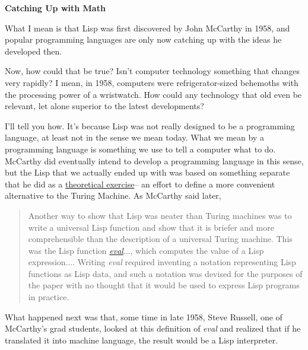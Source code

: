 \textbf{Catching Up with Math}

What I mean is that Lisp was first discovered by
                  John McCarthy in 1958, and popular programming languages are
                  only now catching up with the ideas he developed then.

Now,
                  how could that be true? Isn't computer technology something
                  that changes very rapidly? I mean, in 1958, computers were
                  refrigerator-sized behemoths with the processing power of a
                  wristwatch. How could any technology that old even be
                  relevant, let alone superior to the latest developments?

I'll
                  tell you how. It's because Lisp was not really designed to be
                  a programming language, at least not in the sense we mean
                  today. What we mean by a programming language is something we
                  use to tell a computer what to do. McCarthy did eventually
                  intend to develop a programming language in this sense, but
                  the Lisp that we actually ended up with was based on something
                  separate that he did as a
                  \href{http://www.paulgraham.com/rootsoflisp.html}{theoretical exercise}-- an
                  effort to define a more convenient alternative to the Turing
                  Machine. As McCarthy said later,
                  \begin{quote}

                    Another way to show that Lisp was neater than Turing
                    machines was to write a universal Lisp function and show
                    that it is briefer and more comprehensible than the
                    description of a universal Turing machine. This was the Lisp
                    function
                    \href{https://sep.turbifycdn.com/ty/cdn/paulgraham/jmc.lisp?t=1688221954\&}{\emph{eval}}..., which computes the value of a Lisp expression....
                    Writing \emph{eval} required inventing a notation
                    representing Lisp functions as Lisp data, and such a
                    notation was devised for the purposes of the paper with no
                    thought that it would be used to express Lisp programs in
                    practice.
                  
\end{quote}

                  What happened next was that, some time in late 1958, Steve
                  Russell, one of McCarthy's grad students, looked at this
                  definition of \emph{eval} and realized that if he translated
                  it into machine language, the result would be a Lisp
                  interpreter.

